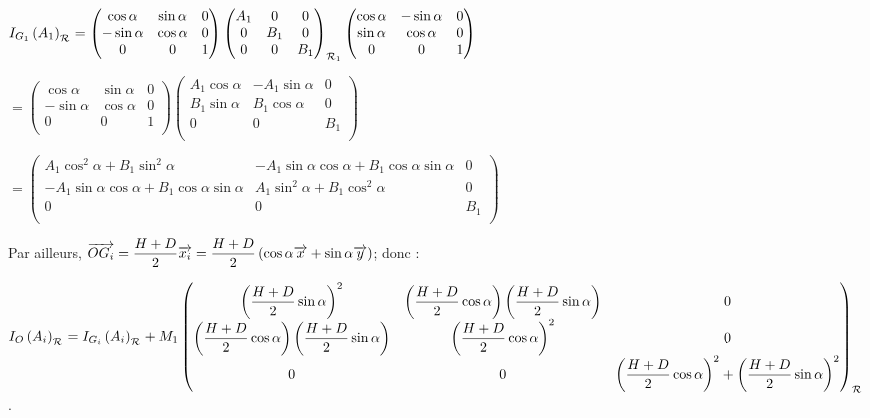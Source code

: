 \documentclass[10pt,fleqn]{article} %
\begin{document}
\begin{multicols}{2}
\begin{corrige}
$\inertie{G_1}{A_1}_{\rep{}}=
\begin{pmatrix} \cos \alpha & \sin\alpha & 0 \\-\sin \alpha & \cos \alpha & 0 \\ 0 & 0 & 1 \\ \end{pmatrix}
\matinertie{A_1}{B_1}{B_1}{0}{0}{0}{\rep{1}}
\begin{pmatrix} \cos \alpha & - \sin\alpha & 0 \\ \sin \alpha & \cos \alpha & 0 \\ 0 & 0 & 1 \\ \end{pmatrix}
$

$=
\begin{pmatrix} \cos \alpha & \sin\alpha & 0 \\-\sin \alpha & \cos \alpha & 0 \\ 0 & 0 & 1 \\ \end{pmatrix}
\begin{pmatrix}A_1 \cos \alpha & -A_1 \sin\alpha & 0 \\ B_1\sin \alpha & B_1\cos \alpha & 0 \\ 0 & 0 & B_1 \\ \end{pmatrix}
$

$=
\begin{pmatrix}
A_1 \cos^2\alpha +B_1 \sin^2\alpha& -A_1 \sin\alpha\cos\alpha+B_1\cos\alpha\sin\alpha & 0 \\ 
-A_1\sin \alpha\cos\alpha+B_1\cos\alpha\sin\alpha  &A_1\sin^2\alpha+ B_1\cos^2 \alpha & 0 \\ 0 & 0 & B_1 \\ \end{pmatrix}
$



Par ailleurs, $\vect{OG_i}=\dfrac{H+D}{2}\vect{x_i}=\dfrac{H+D}{2}\left(\cos\alpha \vect{x}+\sin\alpha \vect{y} \right)$; donc :

  $\inertie{O}{A_i}_{\rep{}}=\inertie{G_i}{A_i}_{\rep{}}+M_1\begin{pmatrix}
\left( \dfrac{H+D}{2} \sin \alpha \right)^2 &\left( \dfrac{H+D}{2} \cos \alpha \right) \left( \dfrac{H+D}{2} \sin \alpha \right) & 0 \\ 
\left( \dfrac{H+D}{2} \cos \alpha \right) \left( \dfrac{H+D}{2} \sin \alpha \right) & \left( \dfrac{H+D}{2} \cos \alpha \right)^2& 0 \\
 0 & 0 &\left( \dfrac{H+D}{2} \cos \alpha \right)^2+\left( \dfrac{H+D}{2} \sin \alpha \right)^2 \\\end{pmatrix}_{\rep{}}$.
 

\end{corrige}
\end{multicols}
\end{document}
